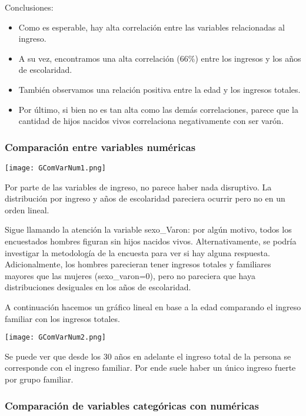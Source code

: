 \documentclass[a4paper]{article}
\begin{document}
    Conclusiones:
    \begin{itemize}
        \item Como es esperable, hay alta correlación entre las variables relacionadas al ingreso.
        \item A su vez, encontramos una alta correlación (66\%) entre los ingresos y los años de escolaridad.
        \item También observamos una relación positiva entre la edad y los ingresos totales.
        \item Por último, si bien no es tan alta como las demás correlaciones, parece que la cantidad de hijos nacidos vivos correlaciona negativamente con ser varón.
    \end{itemize}

        \subsubsection{Comparación entre variables numéricas}
        
        \texttt{[image: GComVarNum1.png]}

        Por parte de las variables de ingreso, no parece haber nada disruptivo. La distribución por ingreso y años de escolaridad pareciera ocurrir pero no en un orden lineal.

        Sigue llamando la atención la variable sexo\_Varon: por algún motivo, todos los encuestados hombres figuran sin hijos nacidos vivos. Alternativamente, se podría investigar la metodología de la encuesta para ver si hay alguna respuesta. Adicionalmente, los hombres parecieran tener ingresos totales y familiares mayores que las mujeres (sexo\_varon=0), pero no pareciera que haya distribuciones desiguales en los años de escolaridad.

        A continuación hacemos un gráfico lineal en base a la edad comparando el ingreso familiar con los ingresos totales. 

        \texttt{[image: GComVarNum2.png]}

        Se puede ver que desde los 30 años en adelante el ingreso total de la persona se corresponde con el ingreso familiar. Por ende suele haber un único ingreso fuerte por grupo familiar.

        \newpage

        \subsubsection{Comparación de variables categóricas con numéricas}
        
\end{document}

